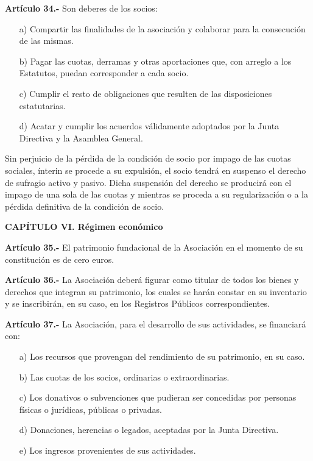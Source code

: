 \documentclass[a4paper,12pt]{article}
\begin{document}
\begin{onehalfspace}
\bigskip\bigskip

\textbf{Artículo 34.-} Son deberes de los socios:
\begin{itemize}
\item [a)] Compartir las finalidades de la asociación y colaborar para la consecución de las mismas.
\item [b)] Pagar las cuotas, derramas y otras aportaciones que, con arreglo a los Estatutos, puedan corresponder a cada socio.
\item [c)] Cumplir el resto de obligaciones que resulten de las disposiciones estatutarias.
\item [d)] Acatar y cumplir los acuerdos válidamente adoptados por la Junta Directiva y la Asamblea General.
\end{itemize}

Sin perjuicio de la pérdida de la condición de socio por impago de las cuotas sociales, ínterin se procede a su expulsión, el socio tendrá en suspenso el derecho de sufragio activo y pasivo. Dicha suspensión del derecho se producirá con el impago de una sola de las cuotas y mientras se proceda a su regularización o a la pérdida definitiva de la condición de socio.

\bigskip\bigskip
\newpage
\begin{center}
\textbf{CAPÍTULO VI. Régimen económico}
\end{center}

\bigskip\bigskip

\textbf{Artículo 35.-} El patrimonio fundacional de la Asociación en el momento de su constitución es de cero euros.

\bigskip\bigskip

\textbf{Artículo 36.-} La Asociación deberá figurar como titular de todos los bienes y derechos que integran su patrimonio, los cuales se harán constar en su inventario y se inscribirán, en su caso, en los Registros Públicos correspondientes.

\bigskip\bigskip

\textbf{Artículo 37.-} La Asociación, para el desarrollo de sus actividades, se financiará con:
\begin{itemize}
\item [a)] Los recursos que provengan del rendimiento de su patrimonio, en su caso.
\item [b)] Las cuotas de los socios, ordinarias o extraordinarias.
\item [c)] Los donativos o subvenciones que pudieran ser concedidas por personas físicas o jurídicas, públicas o privadas.
\item [d)] Donaciones, herencias o legados, aceptadas por la Junta Directiva.
\item [e)] Los ingresos provenientes de sus actividades.
\end{itemize}


\end{onehalfspace}
\end{document}
